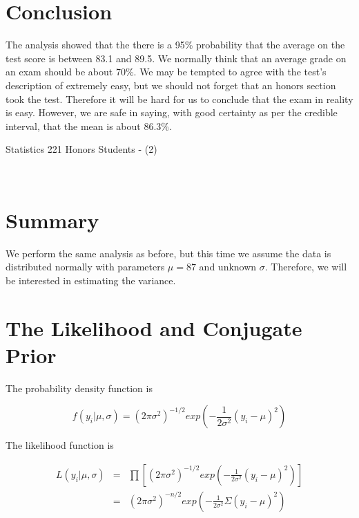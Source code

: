 \documentclass[12pt]{article}
\begin{document}
\section*{Conclusion}

The analysis showed that the there is a 95\% probability that the average on the test score is between 83.1 and 89.5.  We normally think that an average grade on an exam should be about 70\%.  We may be tempted to agree with the test's description of extremely easy, but we should not forget that an honors section took the test.  Therefore it will be hard for us to conclude that the exam in reality is easy.  However, we are safe in saying, with good certainty as per the credible interval, that the mean is about 86.3\%.

\newpage

\begin{center}
\begin{LARGE}
\sc Statistics 221 Honors Students - (2)
\end{LARGE}
\\ [.5 cm]
\end{center}

\section*{Summary}

\noindent We perform the same analysis as before, but this time we assume the data is distributed normally with parameters $\mu=87$ and unknown $\sigma$.  Therefore, we will be interested in estimating the variance.

\section*{The Likelihood and Conjugate Prior}

\noindent The probability density function is

\[f(y_i|\mu,\sigma)=(2\pi\sigma^2)^{-1/2}exp\left(-\frac{1}{2\sigma^2}(y_i-\mu)^2\right)\]

\noindent The likelihood function is

\begin{eqnarray*}
L(y_i|\mu,\sigma) &=& \prod\left[(2\pi\sigma^2)^{-1/2}exp\left(-\frac{1}{2\sigma^2}(y_i-\mu)^2\right)\right] \\
&=& (2\pi\sigma^2)^{-n/2}exp\left(-\frac{1}{2\sigma^2}\Sigma(y_i-\mu)^2\right) \\
\end{eqnarray*}
\end{document}
